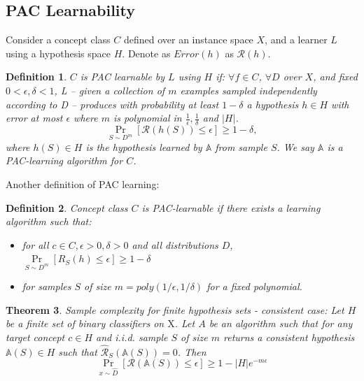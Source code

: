 \documentclass[12pt, a4paper, oneside]{article}
\newtheorem{theorem}{Theorem}[section]
\newtheorem{definition}[theorem]{Definition}
\begin{document}
\subsection{PAC Learnability}
Consider a concept class $C$ defined over an instance space $X$, and a learner $L$
using a hypothesis space $H$. Denote as $Error(h)$ as $\mathcal{R}(h)$. 
\begin{definition}
    $C$ is PAC learnable by $L$ using $H$ if:
    $\forall f \in C$, $\forall D$ over $X$, and fixed $0 < \epsilon, \delta < 1$, L – given a collection of $m$ examples sampled independently according to D – produces with probability at 
    least $1 - \delta$ a hypothesis $h \in H$ with error at most $\epsilon$ where $m$ is polynomial in $\frac{1}{\epsilon}, \frac{1}{\delta}$ and $|H|$.
    \begin{equation*}
        \operatorname{Pr}_{S \sim D^m}[\mathcal{R}(h(S)) \leq \epsilon] \geq 1- \delta,
    \end{equation*}
    where $h(S) \in H$ is the hypothesis learned by $\mathbb{A}$ from sample $S$. We say $\mathbb{A}$ is a PAC-learning algorithm for $C$.
\end{definition}
Another definition of PAC learning:
\begin{definition}
    Concept class $C$ is PAC-learnable if there exists a learning algorithm such that:
    \begin{itemize}
        \item for all $c \in C, \epsilon > 0, \delta > 0$ and all distributions $D$, $\underset{S \sim D^{m}}{\operatorname{Pr}}[R_{S}(h) \leq \epsilon] \geq 1-\delta$
        \item for samples $S$ of size $m = poly(1/\epsilon, 1/\delta)$ for a fixed polynomial.
    \end{itemize}
\end{definition}

\begin{theorem}
    Sample complexity for finite hypothesis sets - consistent case: 
    Let $H$ be a finite set of binary classifiers on $\mathrm{X}$. Let $A$ be an algorithm 
such that for any target concept $c \in H$ and i.i.d. sample $S$ of size $m$ returns a 
consistent hypothesis $\mathbb{A}(S) \in H$ such that $\widehat{\mathcal{R}}_S(\mathbb{A}(S))=0$. Then 
\begin{equation*}
    \operatorname{Pr}_{x \sim \widehat{D}}[\mathcal{R}(\mathbb{A}(S)) \leq \epsilon] \geq 1- |H|e^{-m\epsilon}
\end{equation*}
\end{theorem}


\newpage
% 
% 
\end{document}
